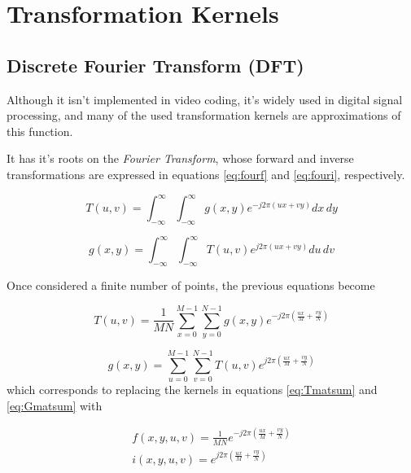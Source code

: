 \section{Transformation Kernels} \label{sec:kernels}

\subsection{Discrete Fourier Transform (DFT)}

Although it isn't implemented in video coding, it's widely used in digital signal processing, and many of the used transformation kernels are approximations of this function.

It has it's roots on the \emph{Fourier Transform}, whose forward and inverse transformations are expressed in equations \ref{eq:fourf} and \ref{eq:fouri}, respectively.

\begin{equation} \label{eq:fourf}
    T(u,v) = \int_{-\infty}^{\infty}\int_{-\infty}^{\infty}g(x,y)e^{-j2\pi(ux+vy)} dx \, dy
\end{equation}

\begin{equation} \label{eq:fouri}
    g(x,y) = \int_{-\infty}^{\infty}\int_{-\infty}^{\infty}T(u,v)e^{j2\pi(ux+vy)} du \, dv
\end{equation}

Once considered a finite number of points, the previous equations become

\begin{equation} \label{eq:dftf}
    T(u,v) = \frac{1}{MN}\sum_{x=0}^{M-1}\sum_{y=0}^{N-1}g(x,y)e^{-j2\pi \left(\frac{ux}{M}+\frac{vy}{N}\right)}
\end{equation}

\begin{equation} \label{eq:dfti}
    g(x,y) = \sum_{u=0}^{M-1}\sum_{v=0}^{N-1}T(u,v)e^{j2\pi \left(\frac{ux}{M}+\frac{vy}{N}\right)}
\end{equation}
which corresponds to replacing the kernels in equations \ref{eq:Tmatsum} and \ref{eq:Gmatsum} with

\begin{gather}
    f(x,y,u,v) = \frac{1}{MN} e^{-j2\pi \left(\frac{ux}{M}+\frac{vy}{N}\right)} \\
    i(x,y,u,v) = e^{j2\pi \left(\frac{ux}{M}+\frac{vy}{N}\right)}
\end{gather}

